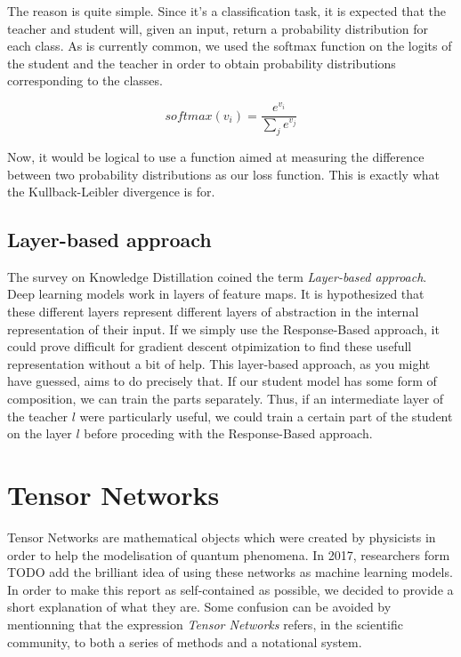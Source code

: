 \documentclass{article}
\theoremstyle{definition}
\theoremstyle{definition}
\begin{document}
The reason is quite simple. Since it's a classification task, it is expected that the teacher and student will, given an input, return a probability distribution for each class. As is currently common, we used the softmax function on the logits of the student and the teacher in order to obtain probability distributions corresponding to the classes. 

\begin{equation}
    softmax(v_i) = \frac{e^{v_i}}{\sum_{j}{e^{v_j}}}
\end{equation}

Now, it would be logical to use a function aimed at measuring the difference between two probability distributions as our loss function. This is exactly what the Kullback-Leibler divergence is for.

\subsection{Layer-based approach}
The survey on Knowledge Distillation coined the term {\it Layer-based approach}.
Deep learning models work in layers of feature maps. It is hypothesized that
these different layers represent different layers of abstraction in the internal
representation of their input. If we simply use the Response-Based approach, it could prove difficult for gradient descent otpimization to find these usefull representation without a bit of help. This layer-based approach, as you might have guessed, aims to do precisely that. If our student model has some form of composition, we can train the parts separately. Thus, if an intermediate layer of the teacher $l$ were particularly useful, we could train a certain part of the student on the layer $l$ before proceding with the Response-Based approach.



\section{Tensor Networks}
Tensor Networks are mathematical objects which were created by physicists in order to help the modelisation of quantum phenomena.
In 2017, researchers form TODO add the brilliant idea of using these networks as machine learning models.
In order to make this report as self-contained as possible, we decided to provide a short explanation of what they are.
Some confusion can be avoided by mentionning that the expression \emph{Tensor Networks} refers, in the scientific community, to both a series of methods and a notational system.
\end{document}
